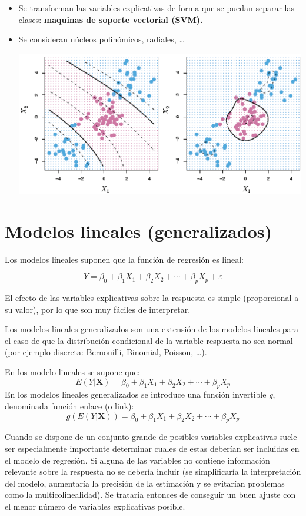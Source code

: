 \documentclass[]{book}
\begin{document}
\begin{itemize}
\item
  Se transforman las variables explicativas de forma que se puedan
  separar las clases: \textbf{maquinas de soporte vectorial (SVM).}
\item
  Se consideran núcleos polinómicos, radiales, \ldots{}

  \includegraphics[width=6.72in]{images/svm4}
\end{itemize}

\section{Modelos lineales
(generalizados)}\label{modelos-lineales-generalizados}

Los modelos lineales suponen que la función de regresión es lineal:

\[Y=\beta_{0}+\beta_{1}X_{1}+\beta_{2}X_{2}+\cdots+\beta_{p}X_{p}+\varepsilon\]

El efecto de las variables explicativas sobre la respuesta es simple
(proporcional a su valor), por lo que son muy fáciles de interpretar.

Los modelos lineales generalizados son una extensión de los modelos
lineales para el caso de que la distribución condicional de la variable
respuesta no sea normal (por ejemplo discreta: Bernouilli, Binomial,
Poisson, \ldots{}).

En los modelo lineales se supone que:
\[E( Y | \mathbf{X} ) = \beta_{0}+\beta_{1}X_{1}+\beta_{2}X_{2}+\cdots+\beta_{p}X_{p}\]
En los modelos lineales generalizados se introduce una función
invertible \emph{g}, denominada función enlace (o link):
\[g\left(E(Y | \mathbf{X} )\right) = \beta_{0}+\beta_{1}X_{1}+\beta_{2}X_{2}+\cdots+\beta_{p}X_{p}\]

Cuando se dispone de un conjunto grande de posibles variables
explicativas suele ser especialmente importante determinar cuales de
estas deberían ser incluidas en el modelo de regresión. Si alguna de las
variables no contiene información relevante sobre la respuesta no se
debería incluir (se simplificaría la interpretación del modelo,
aumentaría la precisión de la estimación y se evitarían problemas como
la multicolinealidad). Se trataría entonces de conseguir un buen ajuste
con el menor número de variables explicativas posible.
\end{document}
